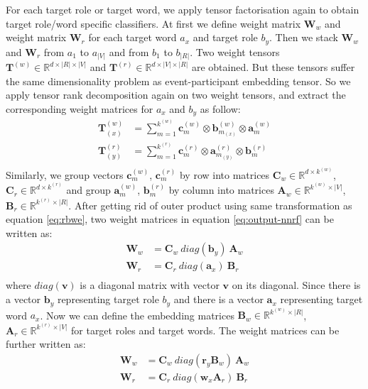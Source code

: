 \documentclass[a4paper]{article}
\begin{document}
For each target role or target word, we apply tensor factorisation again to obtain target role/word specific classifiers. At first we define weight matrix $\mathbf{W}_w$ and weight matrix $\mathbf{W}_r$ for each target word $a_x$ and target role $b_y$. Then we stack $\mathbf{W}_w$ and $\mathbf{W}_r$ from $a_1$ to $a_{|V|}$ and from $b_1$ to $b_{|R|}$. Two weight tensors $\mathbf{T}^{(w)} \in \mathbb{R}^{d \times |R| \times |V|}$ and $\mathbf{T}^{(r)} \in \mathbb{R}^{d \times |V| \times |R|}$ are obtained. But these tensors suffer the same dimensionality problem as event-participant embedding tensor. So we apply tensor rank decomposition again on two weight tensors, and extract the corresponding weight matrices for $a_x$ and $b_y$ as follow: 
\begin{equation} \label{eq:trd-mt-cls}
\begin{aligned}
    \mathbf{T}_{(x)}^{(w)}
        &= \sum_{m=1}^{k^{(w)}} \mathbf{c}_{m}^{(w)} \otimes \mathbf{b}_{m_{(x)}}^{(w)} \otimes \mathbf{a}_m^{(w)} \\
    \mathbf{T}_{(y)}^{(r)}
        &= \sum_{m=1}^{k^{(r)}} \mathbf{c}_{m}^{(r)} \otimes  \mathbf{a}_{m_{(y)}}^{(r)} \otimes \mathbf{b}_m^{(r)} \\
\end{aligned}
\end{equation}
Similarly, we group vectors $\mathbf{c}_{m}^{(w)}$, $\mathbf{c}_{m}^{(r)}$ by row into matrices $\mathbf{C}_w \in \mathbb{R}^{d \times k^{(w)}}$, $\mathbf{C}_r \in \mathbb{R}^{d \times k^{(r)}}$ and group $\mathbf{a}_m^{(w)}$, $\mathbf{b}_m^{(r)}$ by column into matrices $\mathbf{A}_w \in \mathbb{R}^{k^{(w)} \times |V|}$, $\mathbf{B}_r \in \mathbb{R}^{k^{(r)} \times |R|}$. After getting rid of outer product using same transformation as equation \eqref{eq:rbwe}, two weight matrices in equation \eqref{eq:output-nnrf}  can be written as: 
\begin{equation} \label{eq:cls-mt}
\begin{aligned}
    \mathbf{W}_w
        &= \mathbf{C}_w \ diag(\mathbf{b}_y) \ \mathbf{A}_w \\
    \mathbf{W}_r
        &= \mathbf{C}_r \ diag(\mathbf{a}_x) \ \mathbf{B}_r \\
\end{aligned}
\end{equation}
where $diag(\mathbf{v})$ is a diagonal matrix with vector $\mathbf{v}$ on its diagonal. Since there is a vector $\mathbf{b}_y$ representing target role $b_y$ and there is a vector $\mathbf{a}_x$ representing target word $a_x$. Now we can define the embedding matrices $\mathbf{B}_w \in \mathbb{R}^{k^{(w)} \times |R|}$, $\mathbf{A}_r \in \mathbb{R}^{k^{(r)} \times |V|}$ for target roles and target words. The weight matrices can be further written as: 
\begin{equation} \label{eq:cls-mt-temb}
\begin{aligned}
    \mathbf{W}_w
        &= \mathbf{C}_w \ diag(\mathbf{r}_y \mathbf{B}_w) \ \mathbf{A}_w \\
    \mathbf{W}_r
        &= \mathbf{C}_r \ diag(\mathbf{w}_x \mathbf{A}_r) \ \mathbf{B}_r \\
\end{aligned}
\end{equation}
\end{document}
